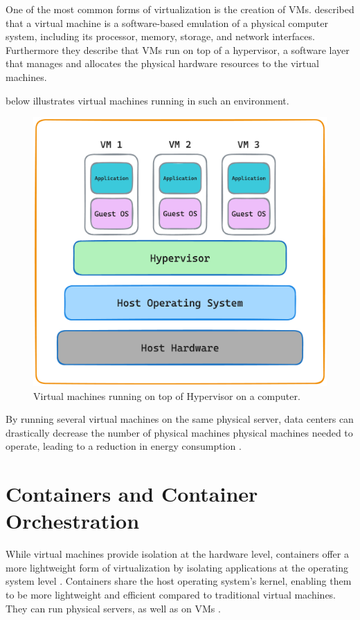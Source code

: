 \documentclass[
  table]{report}
\begin{document}
One of the most common forms of virtualization is the creation of
\ac{VMs}. \citet{barhamXenArtVirtualization2003} described that a
virtual machine is a software-based emulation of a physical computer
system, including its processor, memory, storage, and network
interfaces. Furthermore they describe that \ac{VMs} run on top of a
hypervisor, a software layer that manages and allocates the physical
hardware resources to the virtual machines.

 below illustrates virtual machines running in such an
environment.

\begin{figure}[H]
\centering
  \includegraphics[width=0.7\columnwidth]{assets/3.2-vm-figure.png}
  \caption{Virtual machines running on top of Hypervisor on a computer.}
  \label{vm-figure}
\end{figure}

By running several virtual machines on the same physical server, data
centers can drastically decrease the number of physical machines
physical machines needed to operate, leading to a reduction in energy
consumption \citep{kaplanRevolutionizingDataCenter2008}.

\section{Containers and Container Orchestration}
\label{sect:containers}

While virtual machines provide isolation at the hardware level,
containers offer a more lightweight form of virtualization by isolating
applications at the operating system level
\citep{merkelDockerLightweightLinux2014}. Containers share the host
operating system's kernel, enabling them to be more lightweight and
efficient compared to traditional virtual machines. They can run
physical servers, as well as on \ac{VMs}
\citep{bernsteinContainersCloudLXC2014}.
\end{document}

